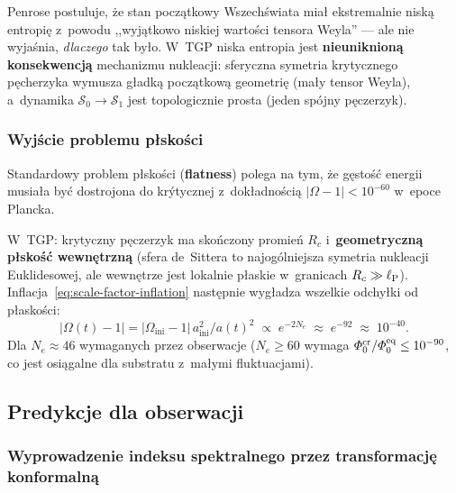 \begin{remark}
Penrose postuluje, \.ze stan pocz\k{a}tkowy Wszech\'swiata
mia\l{} ekstremalnie nisk\k{a} entropi\k{e} z~powodu
,,wyj\k{a}tkowo niskiej warto\'sci tensora Weyla'' ---
ale nie wyja\'snia, \emph{dlaczego} tak by\l{}o. W~TGP
niska entropia jest \textbf{nieuniknion\k{a} konsekwencj\k{a}}
mechanizmu nukleacji: sferyczna symetria krytycznego
p\k{e}cherzyka wymusza g\l{}adk\k{a} pocz\k{a}tkow\k{a}
geometri\k{e} (ma\l{}y tensor Weyla), a~dynamika
$\mathcal{S}_0 \to \mathcal{S}_1$ jest topologicznie
prosta (jeden sp\'ojny p\k{e}czerzyk).
\end{remark}

\subsubsection{Wyj\'scie problemu p\l{}sko\'sci}

Standardowy problem p\l{}sko\'sci (\textbf{flatness}) polega na tym,
\.ze g\k{e}sto\'s\'c energii musia\l{}a by\'c dostrojona do kr\'ytycznej
z~dokładno\'sci\k{a} $|\Omega - 1| < 10^{-60}$ w~epoce Plancka.

W~TGP: krytyczny p\k{e}czerzyk ma sko\'nczony promie\'n $R_c$
i~\textbf{geometryczn\k{a} p\l{}sko\'s\'c wewn\k{e}trzn\k{a}}
(sfera de~Sittera to najog\'olniejsza symetria nukleacji
Euklidesowej, ale wewn\k{e}trze jest lokalnie p\l{}askie
w~granicach $R_c \gg \ell_{\mathrm{P}}$). Inflacja~\eqref{eq:scale-factor-inflation}
nast\k{e}pnie wygładza wszelkie odchyłki od płaskości:
\begin{equation}\label{eq:flatness-resolution}
    |\Omega(t) - 1| = |\Omega_\mathrm{ini} - 1|\,a_\mathrm{ini}^2/a(t)^2
    \;\propto\; e^{-2N_e} \;\approx\; e^{-92} \;\approx\; 10^{-40}.
\end{equation}
Dla $N_e \approx 46$ wymaganych przez obserwacje ($N_e \geq 60$
wymaga $\varPhi_0^{\mathrm{cr}}/\varPhi_0^{\mathrm{eq}} \leq 10^{-90}$,
co jest osiągalne dla substratu z~małymi fluktuacjami).

\subsection{Predykcje dla obserwacji}%
\label{app:G-predykcje}

\subsubsection{Wyprowadzenie indeksu spektralnego przez transformacj\k{e}
konformaln\k{a}}
\label{app:G-starobinsky}

